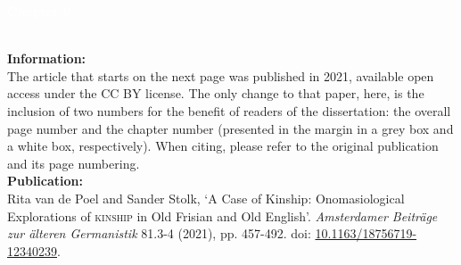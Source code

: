 \noindent{\color{white}\rule{\textwidth}{0.01em}}
\checkoddpage\ifoddpage\newpage\mbox{}\else\fi

\thispagestyle{empty}


\begin{center}
\setlength\fboxsep{1cm}
\noindent\colorbox{evokelightblue}{
\parbox[c][1.0in-2cm]{\textwidth-2cm}{\RaggedLeft\Huge \textbf{\textcolor{white}{Chapter 9}}}}
\end{center}

\noindent{\color{lightgray}\rule{\textwidth}{0.4em}}
\\[2em]
\noindent\textbf{Information:}\\
The article that starts on the next page was published in 2021, available open access under the CC BY license. The only change to that paper, here, is the inclusion of two numbers for the benefit of readers of the dissertation: the overall page number and the chapter number (presented in the margin in a grey box and a white box, respectively). When citing, please refer to the original publication and its page numbering.
\\[1em]
\noindent\textbf{Publication:}\\
    Rita van de Poel and Sander Stolk, `A Case of Kinship: Onomasiological Explorations of \textsc{kinship} in Old Frisian and Old English'. \textit{Amsterdamer Beiträge zur älteren Germanistik} 81.3-4 (2021), pp. 457-492. doi: \href{https://doi.org/10.1163/18756719-12340239}{\url{10.1163/18756719-12340239}}.
\noindent
\\[1em]
\noindent{\color{lightgray}\rule{\textwidth}{0.4em}}
